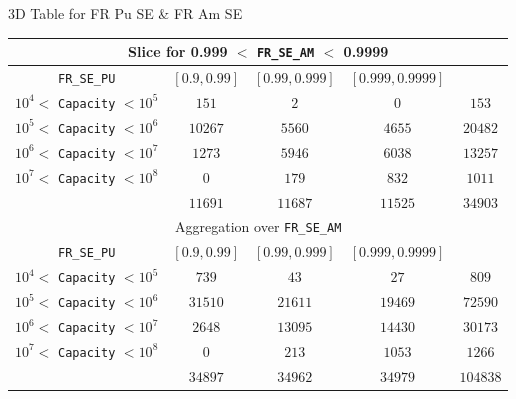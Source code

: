 \documentclass[pdf, autumn, slideColor, nocolorBG]{prosper}
\begin{document}
\begin{slide}{3D Table for FR Pu SE \& FR Am SE}
\begin{center}
\tiny
\begin{tabular}{|c||c|c|c||c|}
\hline
\multicolumn{5}{|c|}{Slice for 0.999 $<$ \texttt{FR\_SE\_AM} $<$ 0.9999}\\
\hline
\texttt{FR\_SE\_PU} & $[0.9, 0.99]$ & $[0.99, 0.999]$& $[0.999, 0.9999]$&\\
\hline
$10^4 <$ \texttt{Capacity} $< 10^5$&$151$&$2$&$0$&$153$\\
\hline
$10^5 <$ \texttt{Capacity} $< 10^6$&$10267$&$5560$&$4655$&$20482$\\
\hline
$10^6 <$ \texttt{Capacity} $< 10^7$&$1273$&$5946$&$6038$&$13257$\\
\hline
$10^7 <$ \texttt{Capacity} $< 10^8$&$0$&$179$&$832$&$1011$\\
\hline
&$11691$&$11687$&$11525$&$34903$\\
\hline
\hline
\multicolumn{5}{|c|}{Aggregation over \texttt{FR\_SE\_AM}}\\
\hline
\texttt{FR\_SE\_PU} & $[0.9, 0.99]$ & $[0.99, 0.999]$& $[0.999, 0.9999]$&\\
\hline
$10^4 <$ \texttt{Capacity} $< 10^5$&$739$&$43$&$27$&$809$\\
\hline
$10^5 <$ \texttt{Capacity} $< 10^6$&$31510$&$21611$&$19469$&$72590$\\
\hline
$10^6 <$ \texttt{Capacity} $< 10^7$&$2648$&$13095$&$14430$&$30173$\\
\hline
$10^7 <$ \texttt{Capacity} $< 10^8$&$0$&$213$&$1053$&$1266$\\
\hline
&$34897$&$34962$&$34979$&$104838$\\
\hline
\end{tabular}
\end{center}
\end{slide}
\end{document}
